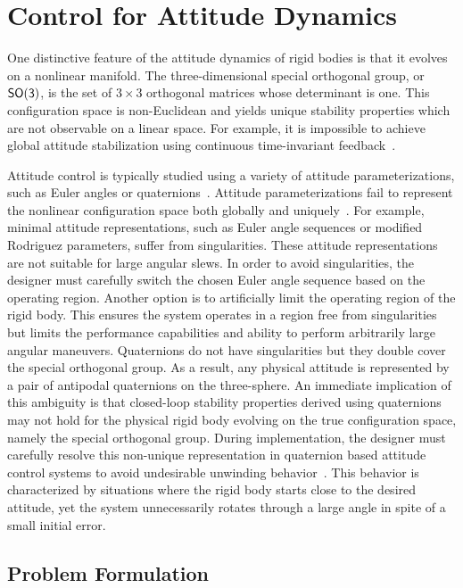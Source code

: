 \section{Control for Attitude Dynamics}\label{sec:attitude_control}

One distinctive feature of the attitude dynamics of rigid bodies is that it evolves on a nonlinear manifold.
The three-dimensional special orthogonal group, or \( \mathsf{SO(3)} \), is the set of \( 3 \times 3 \) orthogonal matrices whose determinant is one.
This configuration space is non-Euclidean and yields unique stability properties which are not observable on a linear space.
For example, it is impossible to achieve global attitude stabilization using continuous time-invariant feedback~\cite{bhat2000}.

Attitude control is typically studied using a variety of attitude parameterizations, such as Euler angles or quaternions~\cite{shuster1993}.
Attitude parameterizations fail to represent the nonlinear configuration space both globally and uniquely~\cite{chaturvedi2011a}.
For example, minimal attitude representations, such as Euler angle sequences or modified Rodriguez parameters, suffer from singularities.
These attitude representations are not suitable for large angular slews.
In order to avoid singularities, the designer must carefully switch the chosen Euler angle sequence based on the operating region.
Another option is to artificially limit the operating region of the rigid body.
This ensures the system operates in a region free from singularities but limits the performance capabilities and ability to perform arbitrarily large angular maneuvers.
Quaternions do not have singularities but they double cover the special orthogonal group.
As a result, any physical attitude is represented by a pair of antipodal quaternions on the three-sphere.
An immediate implication of this ambiguity is that closed-loop stability properties derived using quaternions may not hold for the physical rigid body evolving on the true configuration space, namely the special orthogonal group.
During implementation, the designer must carefully resolve this non-unique representation in quaternion based attitude control systems to avoid undesirable unwinding behavior~\cite{bhat2000}.
This behavior is characterized by situations where the rigid body starts close to the desired attitude, yet the system unnecessarily rotates through a large angle in spite of a small initial error. 

\subsection{Problem Formulation}\label{sec:control_problem_formulation}

